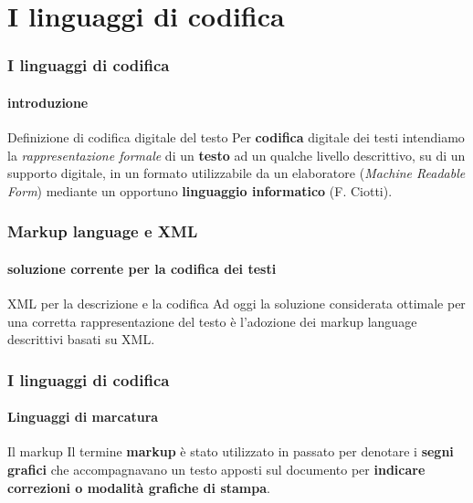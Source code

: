 
\section{I linguaggi di codifica}
\begin{frame}
	\frametitle{I linguaggi di codifica}
	\framesubtitle{introduzione}
	\addtocounter{nframe}{1}

	\begin{block}{Definizione di codifica digitale del testo}
		Per \textbf{codifica} digitale dei testi intendiamo la \textit{rappresentazione formale} di un \textbf{testo} ad un qualche livello descrittivo, su di un supporto digitale, in un formato utilizzabile da un elaboratore (\textit{Machine Readable Form}) mediante un opportuno \textbf{linguaggio informatico} (F. Ciotti).
	\end{block}

\end{frame}

\begin{frame}
	\frametitle{Markup language e XML}
	\framesubtitle{soluzione corrente per la codifica dei testi}
	\addtocounter{nframe}{1}

	\begin{block}{XML per la descrizione e la codifica}
		Ad oggi la soluzione considerata ottimale per una corretta rappresentazione del testo è l'adozione dei markup language descrittivi basati su XML.
	\end{block}


\end{frame}

\begin{frame}
	\frametitle{I linguaggi di codifica}
	\framesubtitle{Linguaggi di marcatura}
	\addtocounter{nframe}{1}

	\begin{block}{Il markup}
		Il termine \textbf{markup} è stato utilizzato in passato per denotare i \textbf{segni grafici} che accompagnavano un testo apposti sul documento per \textbf{indicare correzioni o modalità grafiche di stampa}.
	\end{block}

\end{frame}

